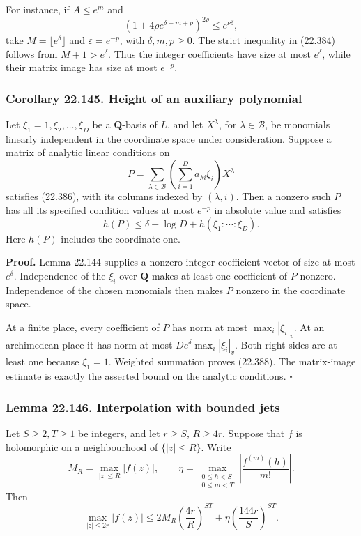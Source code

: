 \documentclass[
  11pt,
  a4paper,
]{article}
\begin{document}
For instance, if \(A\le e^m\) and \[
 (1+4\rho e^{\delta+m+p})^{2\rho}
                     \le e^{\nu\delta},
 \tag{22.386}
\] take \(M=\lfloor e^\delta\rfloor\) and \(\varepsilon=e^{-p}\), with
\(\delta,m,p\ge0\). The strict inequality in (22.384) follows from
\(M+1>e^\delta\). Thus the integer coefficients have size at most
\(e^\delta\), while their matrix image has size at most \(e^{-p}\).

\subsubsection{Corollary 22.145. Height of an auxiliary
polynomial}\label{corollary-22.145.-height-of-an-auxiliary-polynomial}

Let \(\xi_1=1,\xi_2,\ldots,\xi_D\) be a \(\mathbf Q\)-basis of \(L\),
and let \(X^\lambda\), for \(\lambda\in\mathcal B\), be monomials
linearly independent in the coordinate space under consideration.
Suppose a matrix of analytic linear conditions on \[
 P=\sum_{\lambda\in\mathcal B}
       \left(\sum_{i=1}^D a_{\lambda i}\xi_i\right)X^\lambda
 \tag{22.387}
\] satisfies (22.386), with its columns indexed by \((\lambda,i)\). Then
a nonzero such \(P\) has all its specified condition values at most
\(e^{-p}\) in absolute value and satisfies \[
 h(P)\le\delta+\log D+h(\xi_1:\cdots:\xi_D).
 \tag{22.388}
\] Here \(h(P)\) includes the coordinate one.

\textbf{Proof.} Lemma 22.144 supplies a nonzero integer coefficient
vector of size at most \(e^\delta\). Independence of the \(\xi_i\) over
\(\mathbf Q\) makes at least one coefficient of \(P\) nonzero.
Independence of the chosen monomials then makes \(P\) nonzero in the
coordinate space.

At a finite place, every coefficient of \(P\) has norm at most
\(\max_i|\xi_i|_v\). At an archimedean place it has norm at most
\(D e^\delta\max_i|\xi_i|_v\). Both right sides are at least one because
\(\xi_1=1\). Weighted summation proves (22.388). The matrix-image
estimate is exactly the asserted bound on the analytic conditions.
\(\square\)

\subsubsection{Lemma 22.146. Interpolation with bounded
jets}\label{lemma-22.146.-interpolation-with-bounded-jets}

Let \(S\ge2,T\ge1\) be integers, and let \(r\ge S\), \(R\ge4r\). Suppose
that \(f\) is holomorphic on a neighbourhood of \(\{|z|\le R\}\). Write
\[
 M_R=\max_{|z|\le R}|f(z)|,\qquad
 \eta=\max_{\substack{0\le h<S\\0\le m<T}}
                     \left|\frac{f^{(m)}(h)}{m!}\right|.
 \tag{22.389}
\] Then \[
 \max_{|z|\le2r}|f(z)|
 \le 2M_R\left(\frac{4r}{R}\right)^{ST}
               +\eta\left(\frac{144r}{S}\right)^{ST}.
 \tag{22.390}
\]
\end{document}
